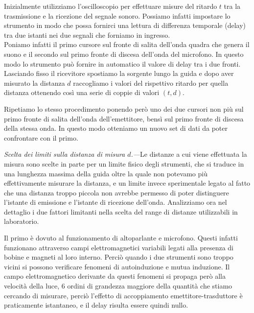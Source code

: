 \documentclass[
    prl,
    reprint, 
    superscriptaddress, 
    altaffilletter, 
    amsmath, 
    amssymb, 
    a4paper,
    varvw]{revtex4-2}
\begin{document}
Inizialmente utilizziamo l'oscilloscopio per effettuare misure del ritardo $t$ tra la trasmissione e la ricezione del segnale sonoro. Possiamo infatti impostare lo strumento in modo che possa fornirci una lettura di differenza temporale (delay) tra due istanti nei due segnali che forniamo in ingresso. \\
Poniamo infatti il primo cursore sul fronte di salita dell'onda quadra che genera il suono e il secondo sul primo fronte di discesa dell'onda del microfono. In questo modo lo strumento può fornire in automatico il valore di delay tra i due fronti. \\
Lasciando fisso il ricevitore spostiamo la sorgente lungo la guida e dopo aver misurato la distanza $d$ raccogliamo i valori del rispettivo ritardo per quella distanza ottenendo così una serie di coppie di valori $(t,d)$.

Ripetiamo lo stesso procedimento ponendo però uno dei due cursori non più sul primo fronte di salita dell'onda dell'emettitore, bensì sul primo fronte di discesa della stessa onda. In questo modo otteniamo un nuovo set di dati da poter confrontare con il primo. 

\textit{Scelta dei limiti sulla distanza di misura $d$.---}Le distanze a cui viene effettuata la misura sono scelte in parte per un limite fisico degli strumenti, che si traduce in una lunghezza massima della guida oltre la quale non potevamo più effettivamente misurare la distanza, e un limite invece sperimentale legato al fatto che una distanza troppo piccola non avrebbe permesso di poter distinguere l'istante di emissione e l'istante di ricezione dell'onda. Analizziamo ora nel dettaglio i due fattori limitanti nella scelta del range di distanze utilizzabili in laboratorio. 

Il primo è dovuto al funzionamento di altoparlante e microfono. Questi infatti funzionano attraverso campi elettromagnetici variabili legati alla presenza di bobine e magneti al loro interno. Perciò quando i due strumenti sono troppo vicini si possono verificare fenomeni di autoinduzione e mutua induzione. Il campo elettromagnetico derivante da questi fenomeni si propaga però alla velocità della luce, 6 ordini di grandezza maggiore della quantità che stiamo cercando di misurare, perciò l'effetto di accoppiamento emettitore-trasduttore è praticamente istantaneo, e il delay risulta essere quindi nullo. 
\end{document}
